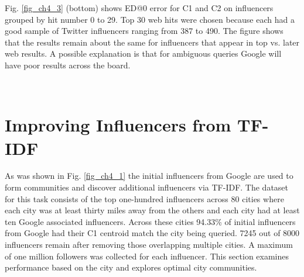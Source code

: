 Fig. \ref{fig_ch4_3} (bottom) shows ED@0 error for C1 and C2 on influencers grouped by hit number 0 to 29. Top 30 web hits were chosen because each had a good sample of Twitter influencers ranging from 387 to 490. The figure shows that the results remain about the same for influencers that appear in top vs. later web results. A possible explanation is that for ambiguous queries Google will have poor results across the board. 

\begin{figure*}[htp]
\centering
\\
   \caption[Performance based on Follower sample size and Query order]{\textbf{Top} -- Performance based on Follower sample size. 500 or more followers provide a good sample for centroid calculation. \textbf{Bottom} -- Results from top 30 URLs illustrate that influencers in top web search results have similar performance as influencers in later web results.} \label{fig_ch4_3}
\end{figure*}

\iffalse
\begin{figure}[htbp]
\centerline{\texttt{[image: fig3.png]}}
\caption[Performance based on Follower sample size and Query order]{Performance based on Follower sample size. 500 or more followers provide a good sample for centroid calculation.}
\label{fig_ch4_3}
\end{figure}

\begin{figure}[htbp]
\centerline{\texttt{[image: fig4.png]}}
\caption[Results based on order of top URLs]{Results from top 30 URLs illustrate that influencers in top web search results have similar performance as influencers in later web results.}
\label{fig_ch4_4}
\end{figure}
\fi

\iffalse
\section{Improving Influencers from TF-IDF}

As was shown in Fig. \ref{fig_ch4_1} the initial influencers from Google are used to form communities and discover additional influencers via TF-IDF. The dataset for this task consists of the top one-hundred influencers across 80 cities where each city was at least thirty miles away from the others and each city had at least ten Google associated influencers. Across these cities 94.33\% of initial influencers from Google had their C1 centroid match the city being queried. 7245 out of 8000 influencers remain after removing those overlapping multiple cities. A maximum of one million followers was collected for each influencer. This section examines performance based on the city and explores optimal city communities.

